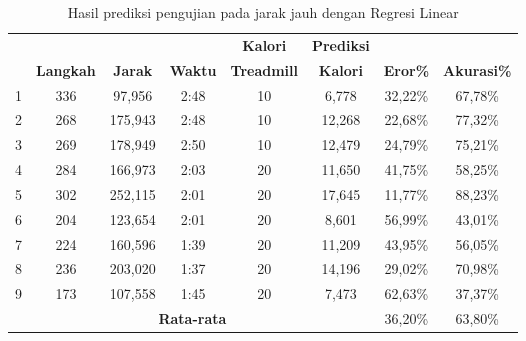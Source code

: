 \begin{longtable}{|c|c|c|c|c|c|c|c|}
  \caption{Hasil prediksi pengujian pada jarak jauh dengan Regresi Linear}
  \label{tb:PengujianJarakJauhAnalisaPrediksiRegresi}                                   \\
  \hline
  \rowcolor[HTML]{C0C0C0}
  & & & & \textbf{Kalori} & \textbf{Prediksi} & & \\
  \rowcolor[HTML]{C0C0C0}
  \multirow{-2}{*}{\textbf{Percobaan}} & \multirow{-2}{*}{\textbf{Langkah}} & \multirow{-2}{*}{\textbf{Jarak}} & \multirow{-2}{*}{\textbf{Waktu}} & \textbf{Treadmill} & \textbf{Kalori} & \multirow{-2}{*}{\textbf{Eror\%}} & \multirow{-2}{*}{\textbf{Akurasi\%}} \\
  
  \hline
  1   & 336   & 97,956     & 2:48    & 10    & 6,778    & 32,22\%      & 67,78\%   \\
  \hline  
  2   & 268   & 175,943    & 2:48    & 10    & 12,268   & 22,68\%      & 77,32\%  \\
  \hline
  3   & 269   & 178,949    & 2:50    & 10    & 12,479   & 24,79\%      & 75,21\%   \\
  \hline
  4   & 284   & 166,973    & 2:03    & 20    & 11,650   & 41,75\%      & 58,25\%  \\
  \hline
  5   & 302   & 252,115    & 2:01    & 20    & 17,645   & 11,77\%      & 88,23\%    \\
  \hline
  6   & 204   & 123,654    & 2:01    & 20    & 8,601    & 56,99\%      & 43,01\%   \\
  \hline
  7   & 224   & 160,596    & 1:39    & 20    & 11,209   & 43,95\%      & 56,05\%   \\
  \hline
  8   & 236   & 203,020    & 1:37    & 20    & 14,196   & 29,02\%      & 70,98\%   \\
  \hline
  9   & 173   & 107,558    & 1:45    & 20    & 7,473    & 62,63\%      & 37,37\%   \\
  \hline

  \multicolumn{6}{|c|}{\textbf{Rata-rata}} & 36,20\% & 63,80\% \\
  \hline
\end{longtable}


